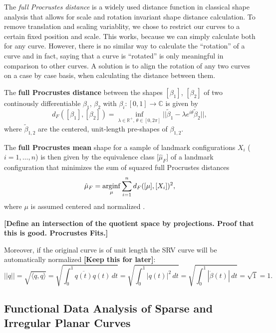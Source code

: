 The \textit{full Procrustes distance} is a widely used distance function in
classical shape analysis that allows for scale and rotation invariant shape
distance calculation.
To remove translation and scaling variablity, we chose to restrict our curves
to a certain fixed position and scale.
This works, because we can simply calculate both for any curve.
However, there is no similar way to calculate the \enquote{rotation} of a
curve and in fact, saying that a curve is \enquote{rotated} is only meaningful in
comparison to other curves. 
A solution is to align the rotation of any two curves on a case by case basis,
when calculating the distance between them.
\begin{definition}
  The \textbf{full Procrustes distance} between the shapes $[\beta_1]$,
  $[\beta_2]$ of two continously differentiable $\beta_1$, $\beta_2$ with
  $\beta_i : [0,1] \rightarrow \mathbb{C}$ is given by 
    $$d_F([\beta_1], [\beta_2]) = \inf_{\lambda \in \mathbb{R}^+,\, \theta \in
    [0,2\pi]} ||\tilde{\beta}_1 - \lambda e^{i\theta} \tilde{\beta}_2||, $$
    where $\tilde\beta_{1,2}$ are the centered, unit-length pre-shapes of
    $\beta_{1,2}$.
\end{definition}
\begin{definition}
    The \textbf{full Procrustes mean} shape for a sample of landmark
    configurations $X_i$ ($i = 1,\dots,n$) is then given by the equivalence
    class [$\hat\mu_F$] of a landmark configuration that minimizes the sum of
    squared full Procrustes distances
    $$\hat{\mu}_F = \operatorname*{arginf}_{\mu} \sum_{i=1}^n d_F([\mu], [X_i])^2, $$
    where $\mu$ is assumed centered and normalized
    \parencites[see][71,114]{DrydenMardia2016}.
\end{definition}

\textbf{[Define an intersection of the quotient space by projections. Proof that this is good. Procrustes Fits.]}

Moreover, if the original curve is of unit length the SRV curve will be automatically normalized \textbf{[Keep this for later]}:
$$ ||q|| = \sqrt{\langle q, q \rangle} = \sqrt{ \int_0^1 \overline{q(t)} q(t) \, dt } = \sqrt{ \int_0^1 |q(t)|^2 \, dt} = \sqrt{\int_0^1 |\dot{\beta}(t)| \, dt} = \sqrt{1} = 1. $$

\subsection{Functional Data Analysis of Sparse and Irregular Planar Curves}
\label{theo:sparse}


\newpage
